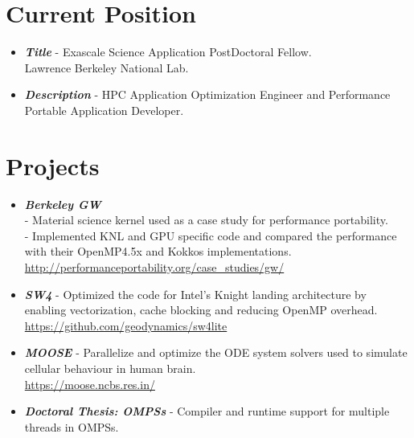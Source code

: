 \documentclass[margin]{res}
\begin{document}
%
\address{
email\ :\ rahulgayatri84@gmail.com\\
phone-number\ :\ +1-9253848354
}

\begin{resume}
%
    \section{Current Position }
    \begin{itemize}
        \item \textbf{\textit{\textrm{Title}}} - Exascale Science Application PostDoctoral Fellow. \\
            Lawrence Berkeley National Lab.
        \item \textbf{\textit{\textrm{Description}}} - HPC Application Optimization Engineer and Performance Portable Application Developer.
    \end{itemize}
%
%
\section{Projects}
\begin{itemize}
%
    \item \textbf{\textit{\textrm{{Berkeley GW}}}} \\
        - Material science kernel used as a case study for performance portability.\\
        - Implemented KNL and GPU specific code and compared the performance with their OpenMP4.5x and Kokkos implementations.\\
        \url{http://performanceportability.org/case_studies/gw/}
%
    \item \textbf{\textit{\textrm{{SW4}}}} -
            Optimized the code for Intel's Knight landing architecture by enabling vectorization, cache blocking and reducing OpenMP overhead.\\
            \url{https://github.com/geodynamics/sw4lite}
%
    \item \textbf{\textit{\textrm{{MOOSE}}}} -
           Parallelize and optimize the ODE system solvers used to simulate cellular behaviour in human brain.\\
           \url{https://moose.ncbs.res.in/}
%
    \item \textbf{\textit{\textrm{{Doctoral Thesis:  OMPSs}}}} -
           Compiler and runtime support for multiple threads in OMPSs.
%
%
\end{itemize}



\end{resume}
\end{document}
